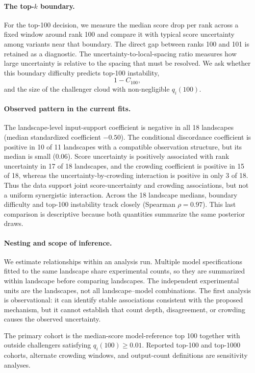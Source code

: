 \documentclass[11pt]{article}
\begin{document}
\paragraph{The top-$k$ boundary.}
For the top-100 decision, we measure the median score drop per rank across a fixed window around rank 100 and compare it with typical score uncertainty among variants near that boundary. The direct gap between ranks 100 and 101 is retained as a diagnostic. The uncertainty-to-local-spacing ratio measures how large uncertainty is relative to the spacing that must be resolved. We ask whether this boundary difficulty predicts top-100 instability,
\[
1-C_{100},
\]
and the size of the challenger cloud with non-negligible $q_i(100)$.

\paragraph{Observed pattern in the current fits.}
The landscape-level input-support coefficient is negative in all 18 landscapes (median standardized coefficient $-0.50$). The conditional discordance coefficient is positive in 10 of 11 landscapes with a compatible observation structure, but its median is small ($0.06$). Score uncertainty is positively associated with rank uncertainty in 17 of 18 landscapes, and the crowding coefficient is positive in 15 of 18, whereas the uncertainty-by-crowding interaction is positive in only 3 of 18. Thus the data support joint score-uncertainty and crowding associations, but not a uniform synergistic interaction. Across the 18 landscape medians, boundary difficulty and top-100 instability track closely (Spearman $\rho=0.97$). This last comparison is descriptive because both quantities summarize the same posterior draws.

\paragraph{Nesting and scope of inference.}
We estimate relationships within an analysis run. Multiple model specifications fitted to the same landscape share experimental counts, so they are summarized within landscape before comparing landscapes. The independent experimental units are the landscapes, not all landscape--model combinations. The first analysis is observational: it can identify stable associations consistent with the proposed mechanism, but it cannot establish that count depth, disagreement, or crowding causes the observed uncertainty.

The primary cohort is the median-score model-reference top 100 together with outside challengers satisfying $q_i(100)\geq0.01$. Reported top-100 and top-1000 cohorts, alternate crowding windows, and output-count definitions are sensitivity analyses.
\end{document}

